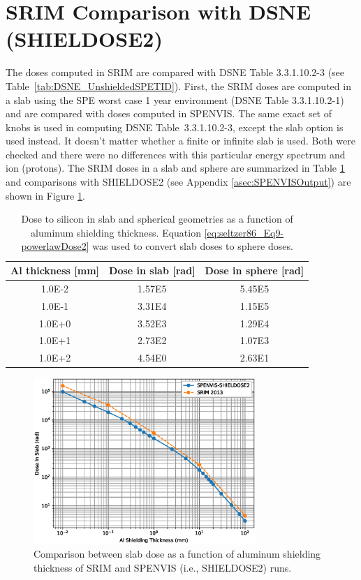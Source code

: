 \documentclass{hitec}
\begin{document}
\section{SRIM Comparison with DSNE (SHIELDOSE2)}
\label{sec:SRIMvsDSNE}

The doses computed in SRIM are compared with DSNE Table 3.3.1.10.2-3 (see Table~\ref{tab:DSNE_UnshieldedSPETID}). First, the SRIM doses are computed in a slab using the SPE worst case 1 year environment (DSNE Table 3.3.1.10.2-1) and are compared with doses computed in SPENVIS. The same exact set of knobs is used in computing DSNE Table~3.3.1.10.2-3, except the \textsf{slab} option is used instead. It doesn't matter whether a finite or infinite slab is used. Both were checked and there were no differences with this particular energy spectrum and ion (protons). The SRIM doses in a slab and sphere are summarized in Table \ref{tab:SRIM_doses} and comparisons with SHIELDOSE2 (see Appendix \ref{asec:SPENVISOutput}) are shown in Figure \ref{fig:Dose_vs_shielding_slab_comparison}.

\begin{table}[h]\centering
	\caption{Dose to silicon in slab and spherical geometries as a function of aluminum shielding thickness. Equation \eqref{eq:seltzer86_Eq9-powerlawDose2} was used to convert slab doses to sphere doses.}\label{tab:SRIM_doses}
	\begin{tabular}{|c | c | c |}\hline
		Al thickness [mm] & Dose in slab [rad] & Dose in sphere [rad]  \\\hline
		1.0E-2 & 1.57E5 & 5.45E5 \\\hline
		1.0E-1 & 3.31E4 & 1.15E5 \\\hline
		1.0E+0 & 3.52E3 & 1.29E4 \\\hline
		1.0E+1 & 2.73E2 & 1.07E3 \\\hline
		1.0E+2 & 4.54E0 & 2.63E1 \\\hline
	\end{tabular}
\end{table}

\begin{figure}[h!]
	\centering
	\includegraphics[width=0.75\textwidth]{Dose_vs_shielding_slab_comparison.eps}
	\caption{Comparison between slab dose as a function of aluminum shielding thickness of SRIM and SPENVIS (i.e., SHIELDOSE2) runs.}\label{fig:Dose_vs_shielding_slab_comparison}
\end{figure}
\end{document}
